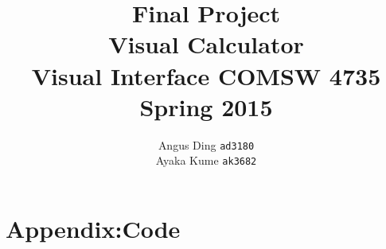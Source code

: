 \documentclass{article}
\title{Final Project\\ Visual Calculator \\ \large Visual Interface COMSW 4735 Spring 2015}
\author{Angus Ding {\tt ad3180}\\ Ayaka Kume {\tt ak3682}}
\begin{document}
\maketitle
\clearpage





\clearpage
\section*{Appendix:Code}
\end{document}
